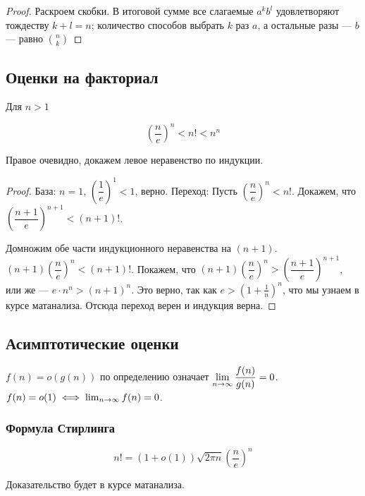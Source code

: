 \documentclass[a4paper]{report}
\begin{document}
    \begin{proof}
        Раскроем скобки.
        В итоговой сумме все слагаемые $a^k b^l$ удовлетворяют тождеству $k+l=n$; количество способов выбрать $k$ раз $a$, а остальные разы --- $b$ --- равно $\binom{n}{k}$
    \end{proof}

    \subsection{Оценки на факториал}

    Для $n > 1$

    \[\left(\dfrac{n}{e}\right)^n < n! < n^n\]

    Правое очевидно, докажем левое неравенство по индукции.

    \begin{proof}
        База: $n = 1$, $\left(\dfrac{1}{e}\right)^1 < 1$, верно.
        Переход: Пусть $\left(\dfrac{n}{e}\right)^n < n!$.
        Докажем, что $\left(\dfrac{n + 1}{e}\right)^{n+1} < (n+1)!$.

        Домножим обе части индукционного неравенства на $(n + 1)$. $(n + 1)\left(\dfrac{n}{e}\right)^n < (n+1)!$.
        Покажем, что $(n + 1)\left(\dfrac{n}{e}\right)^n > \left(\dfrac{n+1}{e}\right)^{n+1}$, или же --- $e\cdot n^n > (n+1)^n$.
        Это верно, так как $e > \left(1 + \frac{1}{n}\right)^n$, что мы узнаем в курсе матанализа.
        Отсюда переход верен и индукция верна.

    \end{proof}

    \subsection{Асимптотические оценки}

    $f(n) = o(g(n))$ по определению означает $\lim\limits_{n \rightarrow \infty}\dfrac{f(n)}{g(n)} = 0$. $f(n) = o(1) \iff \lim_{n \rightarrow \infty}f(n) = 0$.

    \subsubsection{Формула Стирлинга}

    \[n! = (1+ o(1))\sqrt{2\pi n}\left(\frac{n}{e}\right)^n\]

    Доказательство будет в курсе матанализа.
\end{document}
